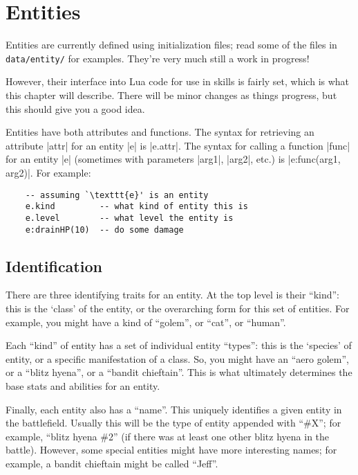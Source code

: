 \chapter{Entities}
\label{ch:entities}

Entities are currently defined using initialization files;
read some of the files in \texttt{data/entity/} for examples.
They're very much still a work in progress!

However, their interface into Lua code for use in skills is fairly set,
which is what this chapter will describe.
There will be minor changes as things progress,
but this should give you a good idea.

Entities have both attributes and functions.
The syntax for retrieving an attribute |attr| for an entity |e| is |e.attr|.
The syntax for calling a function |func| for an entity |e|
(sometimes with parameters |arg1|, |arg2|, etc.) is |e:func(arg1, arg2)|.
For example:

\begin{lstlisting}
    -- assuming `\texttt{e}' is an entity
    e.kind         -- what kind of entity this is
    e.level        -- what level the entity is
    e:drainHP(10)  -- do some damage
\end{lstlisting}

\section{Identification}
\label{sec:entity_ident}

There are three identifying traits for an entity.
At the top level is their ``kind'': this is the `class' of the entity,
or the overarching form for this set of entities.
For example, you might have a kind of ``golem'', or ``cat'', or ``human''.

Each ``kind'' of entity has a set of individual entity ``types'':
this is the `species' of entity, or a specific manifestation of a class.
So, you might have an ``aero golem'', or a ``blitz hyena'', or a ``bandit chieftain''.
This is what ultimately determines the base stats and abilities for an entity.

Finally, each entity also has a ``name''.
This uniquely identifies a given entity in the battlefield.
Usually this will be the type of entity appended with ``\#X'';
for example, ``blitz hyena \#2''
(if there was at least one other blitz hyena in the battle).
However, some special entities might have more interesting names;
for example, a bandit chieftain might be called ``Jeff''.

